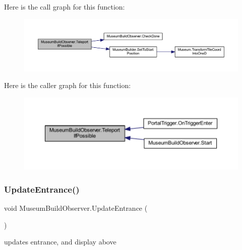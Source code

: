 Here is the call graph for this function\+:
\nopagebreak
\begin{figure}[H]
\begin{center}
\leavevmode
\includegraphics[width=350pt]{class_museum_build_observer_a506c7314ea2734e8f4881167ab5f2460_cgraph}
\end{center}
\end{figure}
Here is the caller graph for this function\+:
\nopagebreak
\begin{figure}[H]
\begin{center}
\leavevmode
\includegraphics[width=350pt]{class_museum_build_observer_a506c7314ea2734e8f4881167ab5f2460_icgraph}
\end{center}
\end{figure}
\mbox{\label{class_museum_build_observer_aa808cdf3870a709891e1dc4262c5aec1}} 
\subsubsection{\texorpdfstring{Update\+Entrance()}{UpdateEntrance()}}
{\footnotesize\ttfamily void Museum\+Build\+Observer.\+Update\+Entrance (\begin{DoxyParamCaption}{ }\end{DoxyParamCaption})}



updates entrance, and display above 


